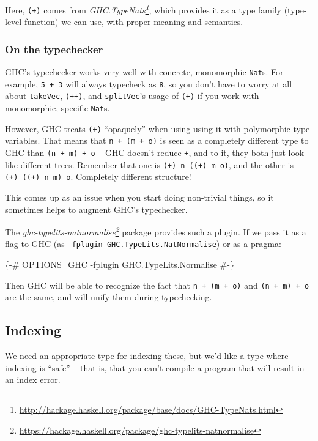 \documentclass[]{article}
\newenvironment{Shaded}{}{}
\newcommand{\OtherTok}[1]{\textcolor[rgb]{0.00,0.44,0.13}{#1}}
\renewcommand{\href}[2]{#2\footnote{\url{#1}}}
\begin{document}
Here, \texttt{(+)} comes from
\emph{\href{http://hackage.haskell.org/package/base/docs/GHC-TypeNats.html}{GHC.TypeNats}},
which provides it as a type family (type-level function) we can use, with proper
meaning and semantics.

\subsubsection{On the typechecker}\label{on-the-typechecker}

GHC's typechecker works very well with concrete, monomorphic \texttt{Nat}s. For
example, \texttt{5\ +\ 3} will always typecheck as \texttt{8}, so you don't have
to worry at all about \texttt{takeVec}, \texttt{(++)}, and \texttt{splitVec}'s
usage of \texttt{(+)} if you work with monomorphic, specific \texttt{Nat}s.

However, GHC treats \texttt{(+)} ``opaquely'' when using using it with
polymorphic type variables. That means that \texttt{n\ +\ (m\ +\ o)} is seen as
a completely different type to GHC than \texttt{(n\ +\ m)\ +\ o} -- GHC doesn't
reduce \texttt{+}, and to it, they both just look like different trees. Remember
that one is \texttt{(+)\ n\ ((+)\ m\ o)}, and the other is
\texttt{(+)\ ((+)\ n\ m)\ o}. Completely different structure!

This comes up as an issue when you start doing non-trivial things, so it
sometimes helps to augment GHC's typechecker.

The
\emph{\href{https://hackage.haskell.org/package/ghc-typelits-natnormalise}{ghc-typelits-natnormalise}}
package provides such a plugin. If we pass it as a flag to GHC (as
\texttt{-fplugin\ GHC.TypeLits.NatNormalise}) or as a pragma:

\begin{Shaded}
\begin{Highlighting}[]
\OtherTok{\{-# OPTIONS_GHC -fplugin GHC.TypeLits.Normalise #-\}}
\end{Highlighting}
\end{Shaded}

Then GHC will be able to recognize the fact that \texttt{n\ +\ (m\ +\ o)} and
\texttt{(n\ +\ m)\ +\ o} are the same, and will unify them during typechecking.

\subsection{Indexing}\label{indexing}

We need an appropriate type for indexing these, but we'd like a type where
indexing is ``safe'' -- that is, that you can't compile a program that will
result in an index error.
\end{document}
